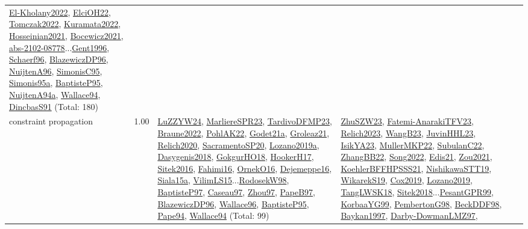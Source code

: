 {\begin{longtable}{p{3cm}r>{\raggedright\arraybackslash}p{6cm}>{\raggedright\arraybackslash}p{6cm}>{\raggedright\arraybackslash}p{8cm}}
\hyperref[detail:El-Kholany2022]{El-Kholany2022}, \hyperref[detail:ElciOH22]{ElciOH22}, \hyperref[detail:Tomczak2022]{Tomczak2022}, \hyperref[detail:Kuramata2022]{Kuramata2022}, \hyperref[detail:Hosseinian2021]{Hosseinian2021}, \hyperref[detail:Bocewicz2021]{Bocewicz2021}, \hyperref[detail:abs-2102-08778]{abs-2102-08778}...\hyperref[detail:Gent1996]{Gent1996}, \hyperref[detail:Schaerf96]{Schaerf96}, \hyperref[detail:BlazewiczDP96]{BlazewiczDP96}, \hyperref[detail:NuijtenA96]{NuijtenA96}, \hyperref[detail:SimonisC95]{SimonisC95}, \hyperref[detail:Simonis95a]{Simonis95a}, \hyperref[detail:BaptisteP95]{BaptisteP95}, \hyperref[detail:NuijtenA94a]{NuijtenA94a}, \hyperref[detail:Wallace94]{Wallace94}, \hyperref[detail:DincbasS91]{DincbasS91} (Total: 180)\\
\index{constraint propagation}\index{CP!constraint propagation}constraint propagation &  1.00 & \hyperref[detail:LuZZYW24]{LuZZYW24}, \hyperref[detail:MarliereSPR23]{MarliereSPR23}, \hyperref[detail:TardivoDFMP23]{TardivoDFMP23}, \hyperref[detail:Braune2022]{Braune2022}, \hyperref[detail:PohlAK22]{PohlAK22}, \hyperref[detail:Godet21a]{Godet21a}, \hyperref[detail:Groleaz21]{Groleaz21}, \hyperref[detail:Relich2020]{Relich2020}, \hyperref[detail:SacramentoSP20]{SacramentoSP20}, \hyperref[detail:Lozano2019a]{Lozano2019a}, \hyperref[detail:Dasygenis2018]{Dasygenis2018}, \hyperref[detail:GokgurHO18]{GokgurHO18}, \hyperref[detail:HookerH17]{HookerH17}, \hyperref[detail:Sitek2016]{Sitek2016}, \hyperref[detail:Fahimi16]{Fahimi16}, \hyperref[detail:OrnekO16]{OrnekO16}, \hyperref[detail:Dejemeppe16]{Dejemeppe16}, \hyperref[detail:Siala15a]{Siala15a}, \hyperref[detail:VilimLS15]{VilimLS15}...\hyperref[detail:RodosekW98]{RodosekW98}, \hyperref[detail:BaptisteP97]{BaptisteP97}, \hyperref[detail:Caseau97]{Caseau97}, \hyperref[detail:Zhou97]{Zhou97}, \hyperref[detail:PapeB97]{PapeB97}, \hyperref[detail:BlazewiczDP96]{BlazewiczDP96}, \hyperref[detail:Wallace96]{Wallace96}, \hyperref[detail:BaptisteP95]{BaptisteP95}, \hyperref[detail:Pape94]{Pape94}, \hyperref[detail:Wallace94]{Wallace94} (Total: 99) & \hyperref[detail:ZhuSZW23]{ZhuSZW23}, \hyperref[detail:Fatemi-AnarakiTFV23]{Fatemi-AnarakiTFV23}, \hyperref[detail:Relich2023]{Relich2023}, \hyperref[detail:WangB23]{WangB23}, \hyperref[detail:JuvinHHL23]{JuvinHHL23}, \hyperref[detail:IsikYA23]{IsikYA23}, \hyperref[detail:MullerMKP22]{MullerMKP22}, \hyperref[detail:SubulanC22]{SubulanC22}, \hyperref[detail:ZhangBB22]{ZhangBB22}, \hyperref[detail:Song2022]{Song2022}, \hyperref[detail:Edis21]{Edis21}, \hyperref[detail:Zou2021]{Zou2021}, \hyperref[detail:KoehlerBFFHPSSS21]{KoehlerBFFHPSSS21}, \hyperref[detail:NishikawaSTT19]{NishikawaSTT19}, \hyperref[detail:WikarekS19]{WikarekS19}, \hyperref[detail:Cox2019]{Cox2019}, \hyperref[detail:Lozano2019]{Lozano2019}, \hyperref[detail:TangLWSK18]{TangLWSK18}, \hyperref[detail:Sitek2018]{Sitek2018}...\hyperref[detail:PesantGPR99]{PesantGPR99}, \hyperref[detail:KorbaaYG99]{KorbaaYG99}, \hyperref[detail:PembertonG98]{PembertonG98}, \hyperref[detail:BeckDDF98]{BeckDDF98}, \hyperref[detail:Baykan1997]{Baykan1997}, \hyperref[detail:Darby-DowmanLMZ97]{Darby-DowmanLMZ97}, 
\end{longtable}}
